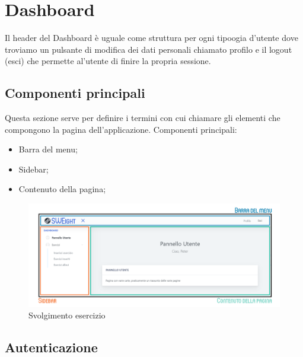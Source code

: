\section{Dashboard}
Il header del Dashboard è uguale come struttura per ogni tipoogia d'utente dove troviamo un pulsante di modifica dei dati 
personali chiamato profilo e il logout (esci) che permette al'utente  di finire la propria sessione.



\subsection{Componenti principali}
    Questa sezione serve per definire i termini con cui chiamare gli elementi che compongono la pagina dell'applicazione.
    Componenti principali:
    \begin{itemize}
        \item Barra del menu;
        \item {Sidebar};
        \item Contenuto della pagina;
    \end{itemize}

    \begin{figure}[H]
        \centering
        \includegraphics[width=17cm]{sez/img/istruzioni/dashboardMod.png} 
        \caption{Svolgimento esercizio}\label{fig:1}
    \end{figure}
\newpage

\subsection{Autenticazione}
